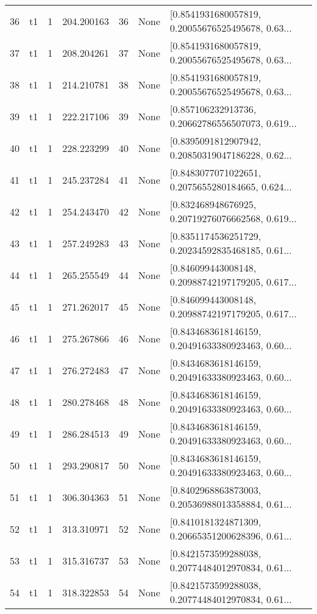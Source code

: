 \begin{tabular}{lllrlll}
36  &  t1 &   1 &  204.200163 &   36 &  None &  [0.8541931680057819, 0.20055676525495678, 0.63... \\
37  &  t1 &   1 &  208.204261 &   37 &  None &  [0.8541931680057819, 0.20055676525495678, 0.63... \\
38  &  t1 &   1 &  214.210781 &   38 &  None &  [0.8541931680057819, 0.20055676525495678, 0.63... \\
39  &  t1 &   1 &  222.217106 &   39 &  None &  [0.857106232913736, 0.20662786556507073, 0.619... \\
40  &  t1 &   1 &  228.223299 &   40 &  None &  [0.8395091812907942, 0.20850319047186228, 0.62... \\
41  &  t1 &   1 &  245.237284 &   41 &  None &  [0.8483077071022651, 0.2075655280184665, 0.624... \\
42  &  t1 &   1 &  254.243470 &   42 &  None &  [0.832468948676925, 0.20719276076662568, 0.619... \\
43  &  t1 &   1 &  257.249283 &   43 &  None &  [0.8351174536251729, 0.20234592835468185, 0.61... \\
44  &  t1 &   1 &  265.255549 &   44 &  None &  [0.846099443008148, 0.20988742197179205, 0.617... \\
45  &  t1 &   1 &  271.262017 &   45 &  None &  [0.846099443008148, 0.20988742197179205, 0.617... \\
46  &  t1 &   1 &  275.267866 &   46 &  None &  [0.8434683618146159, 0.20491633380923463, 0.60... \\
47  &  t1 &   1 &  276.272483 &   47 &  None &  [0.8434683618146159, 0.20491633380923463, 0.60... \\
48  &  t1 &   1 &  280.278468 &   48 &  None &  [0.8434683618146159, 0.20491633380923463, 0.60... \\
49  &  t1 &   1 &  286.284513 &   49 &  None &  [0.8434683618146159, 0.20491633380923463, 0.60... \\
50  &  t1 &   1 &  293.290817 &   50 &  None &  [0.8434683618146159, 0.20491633380923463, 0.60... \\
51  &  t1 &   1 &  306.304363 &   51 &  None &  [0.8402968863873003, 0.20536988013358884, 0.61... \\
52  &  t1 &   1 &  313.310971 &   52 &  None &  [0.8410181324871309, 0.20665351200628396, 0.61... \\
53  &  t1 &   1 &  315.316737 &   53 &  None &  [0.8421573599288038, 0.20774484012970834, 0.61... \\
54  &  t1 &   1 &  318.322853 &   54 &  None &  [0.8421573599288038, 0.20774484012970834, 0.61... \\

\end{tabular}
